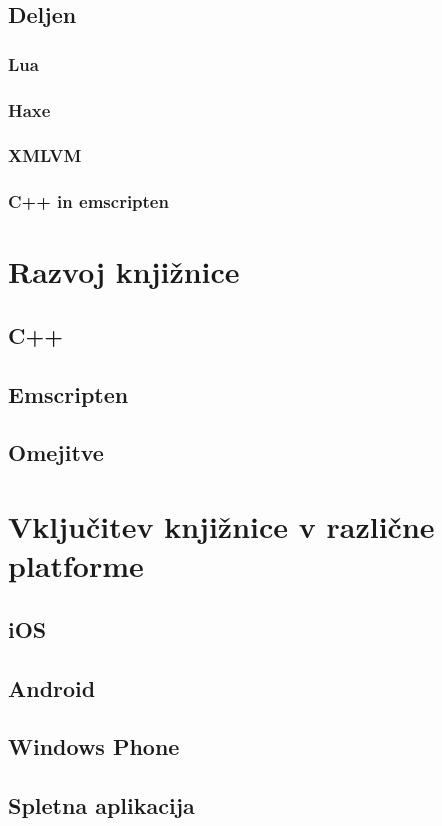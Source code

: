 \section{Deljen}

\subsection{Lua}

\subsection{Haxe}

\subsection{XMLVM}

\subsection{C++ in emscripten}

\chapter{Razvoj knjižnice}
\label{chap:development}

\section{C++}

\section{Emscripten}

\section{Omejitve}

\chapter{Vključitev knjižnice v različne platforme}
\label{chap:cross-platform}

\section{iOS}

\section{Android}

\section{Windows Phone}

\section{Spletna aplikacija}
